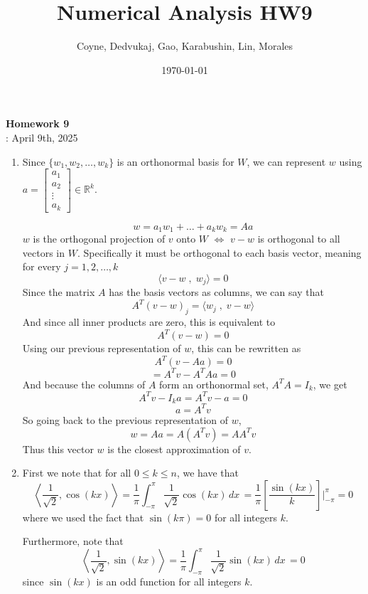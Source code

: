 \documentclass[12pt]{article}
\title{Numerical Analysis HW9}
\author{Coyne, Dedvukaj, Gao, Karabushin, Lin, Morales}
\date{\today}
\begin{document}
\pagestyle{fancy}


\begin{center}
\textbf{\Large Homework 9} \\
: April 9th, 2025
\end{center}

\begin{enumerate}[leftmargin=0em]
    \item
    Since $\{w_1,w_2,\dots,w_k\}$ is an orthonormal basis for $W$, we can represent $w$ using
    $a = \begin{bmatrix}
           a_1 \\
           a_2 \\
           \vdots \\
           a_k
         \end{bmatrix}
         \in \mathbb{R}^k$.

    \[
    w = a_1w_1+\dots + a_kw_k = Aa
    \]
    $w$ is the orthogonal projection of $v$ onto $W$ $\iff$ $v-w$ is orthogonal to all vectors in $W$. Specifically it must be orthogonal to each basis vector, meaning for every $j=1,2,\dots,k$
    \[
    \langle v-w \; , \; w_j \rangle = 0
    \]
    Since the matrix $A$ has the basis vectors as columns, we can say that
    \[
    A^T(v-w)_j = \langle w_j \; , \; v-w \rangle
    \]
    And since all inner products are zero, this is equivalent to
    \[
    A^T(v-w)=0
    \]
    Using our previous representation of $w$, this can be rewritten as
    \[
    A^T(v-Aa) = 0
    \]
    \[
    = A^Tv-A^TAa = 0
    \]
    And because the columns of $A$ form an orthonormal set, $A^TA=I_k$, we get
    \[
    A^Tv-I_ka =A^Tv-a = 0
    \]
    \[
    a = A^Tv
    \]
    So going back to the previous representation of $w$,
    \[
    w = Aa = A(A^Tv) = AA^Tv
    \]
    Thus this vector $w$ is the closest approximation of $v$.

    \item  
    First we note that for all $0\leq k \leq n$, we have that 
    \[\left\langle \frac{1}{\sqrt{2}},\cos(kx)\right\rangle=\frac{1}{\pi}\int_{-\pi}^{\pi}\frac{1}{\sqrt{2}} \cos(kx)\, dx\, = \frac{1}{\pi}\left[\frac{\sin(kx)}{k}\right]\bigg\rvert_{-\pi}^{\pi}=0\]
    where we used the fact that $\sin(k\pi) =0$ for all integers $k$.

    \smallskip


    \noindent Furthermore, note that
    \[\left\langle \frac{1}{\sqrt{2}},\sin(kx)\right\rangle=\frac{1}{\pi}\int_{-\pi}^{\pi}\frac{1}{\sqrt{2}} \sin(kx)\, dx\, = 0\]
    since $\sin(kx)$ is an odd function for all integers $k$. 
    

\end{enumerate}
\end{document}
